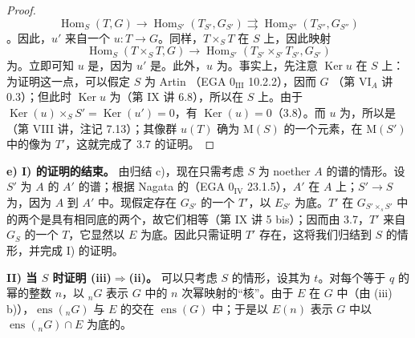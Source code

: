 \begin{proof}
\[\operatorname{Hom}_S(T,G)\longrightarrow\operatorname{Hom}_{S'}(T_{S'},G_{S'})\rightrightarrows\operatorname{Hom}_{S''}(T_{S''},G_{S''})\]
。因此，$u'$ 来自一个 $u:T\to G$。同样，$T\times_S T$ 在 $S$ 上，因此映射
\[\operatorname{Hom}_S(T\times_S T,G)\longrightarrow\operatorname{Hom}_{S'}(T_{S'}\times_{S'}T_{S'},G_{S'})\]
为。立即可知 $u$ 是，因为 $u'$ 是。此外，$u$ 为。事实上，先注意 $\operatorname{Ker}u$ 在 $S$ 上：为证明这一点，可以假定 $S$ 为 Artin （EGA 0$_{\mathrm{III}}$ 10.2.2），因而 $G$ （第 VI$_A$ 讲 0.3）；但此时 $\operatorname{Ker}u$ 为（第 IX 讲 6.8），所以在 $S$ 上。由于 $\operatorname{Ker}(u)\times_S S'=\operatorname{Ker}(u')=0$，有 $\operatorname{Ker}(u)=0$（3.8）。而 $u$ 为，所以是（第 VIII 讲，注记 7.13）；其像群 $u(T)$ 确为 $\mathrm M(S)$ 的一个元素，在 $\mathrm M(S')$ 中的像为 $T'$，这就完成了 3.7 的证明。
\end{proof}
\textbf{e) I) 的证明的结束。}
由归结 c)，现在只需考虑 $S$ 为 noether  $A$ 的谱的情形。设 $S'$ 为 $A$ 的 $A'$ 的谱；根据 Nagata 的（EGA 0$_{\mathrm{IV}}$ 23.1.5），$A'$ 在 $A$ 上；$S'\to S$ 为，因为 $A$ 到 $A'$ 中。现假定存在 $G_{S'}$ 的一个 $T'$，以 $E_{S'}$ 为底。$T'$ 在 $G_{S'\times_s S'}$ 中的两个是具有相同底的两个，故它们相等（第 IX 讲 5 bis）；因而由 3.7，$T'$ 来自 $G_S$ 的一个 $T$，它显然以 $E$ 为底。因此只需证明 $T'$ 存在，这将我们归结到 $S$ 的情形，并完成 I) 的证明。

\textbf{II) 当 $S$ 时证明 (iii)$\Rightarrow$(ii)。}
可以只考虑 $S$ 的情形，设其为 $t$。对每个等于 $q$ 的幂的整数 $n$，以 ${}_nG$ 表示 $G$ 中的 $n$ 次幂映射的“核”。由于 $E$ 在 $G$ 中（由 (iii) b)），$\operatorname{ens}({}_nG)$ 与 $E$ 的交在 $\operatorname{ens}(G)$ 中；于是以 $E(n)$ 表示 $G$ 中以 $\operatorname{ens}({}_nG)\cap E$ 为底的。

